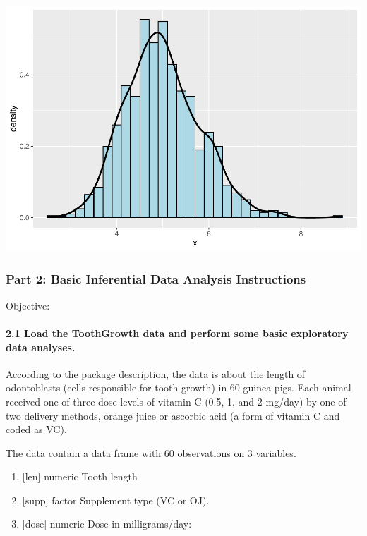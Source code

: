 \documentclass[
  landscape]{article}
\providecommand{\tightlist}{%
  \setlength{\itemsep}{0pt}\setlength{\parskip}{0pt}}
\begin{document}
\includegraphics{PA1_files/figure-latex/unnamed-chunk-3-1.pdf}

\hypertarget{part-2-basic-inferential-data-analysis-instructions}{%
\subsubsection{Part 2: Basic Inferential Data Analysis
Instructions}\label{part-2-basic-inferential-data-analysis-instructions}}

Objective:

\hypertarget{load-the-toothgrowth-data-and-perform-some-basic-exploratory-data-analyses.}{%
\paragraph{2.1 Load the ToothGrowth data and perform some basic
exploratory data
analyses.}\label{load-the-toothgrowth-data-and-perform-some-basic-exploratory-data-analyses.}}

According to the package description, the data is about the length of
odontoblasts (cells responsible for tooth growth) in 60 guinea pigs.
Each animal received one of three dose levels of vitamin C (0.5, 1, and
2 mg/day) by one of two delivery methods, orange juice or ascorbic acid
(a form of vitamin C and coded as VC).

The data contain a data frame with 60 observations on 3 variables.

\begin{enumerate}
\def\labelenumi{\arabic{enumi}.}
\tightlist
\item
  {[}len{]} numeric Tooth length
\item
  {[}supp{]} factor Supplement type (VC or OJ).
\item
  {[}dose{]} numeric Dose in milligrams/day:
\end{enumerate}
\end{document}
